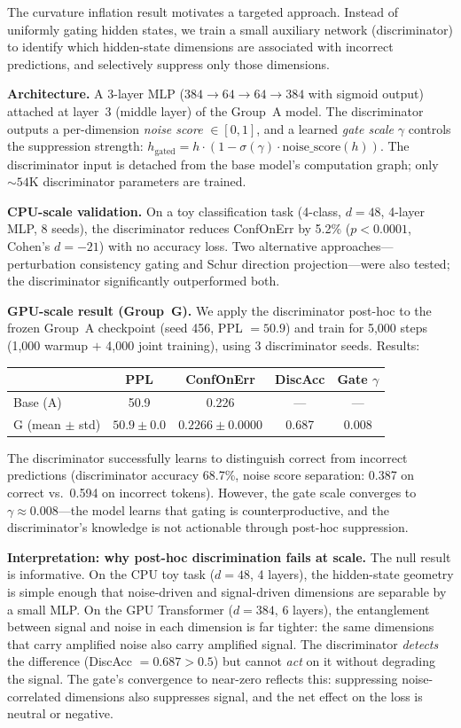 \documentclass[11pt,a4paper]{article}
\theoremstyle{definition}
\begin{document}
The curvature inflation result motivates a targeted approach.
Instead of uniformly gating hidden states, we train a small
auxiliary network (discriminator) to identify which hidden-state
dimensions are associated with incorrect predictions, and
selectively suppress only those dimensions.

\textbf{Architecture.} A 3-layer MLP ($384 \to 64 \to 64 \to 384$
with sigmoid output) attached at layer~3 (middle layer) of the
Group~A model. The discriminator outputs a per-dimension
\emph{noise score} $\in [0,1]$, and a learned \emph{gate scale}
$\gamma$ controls the suppression strength:
$h_{\mathrm{gated}} = h \cdot (1 - \sigma(\gamma) \cdot
\mathrm{noise\_score}(h))$.
The discriminator input is detached from the base model's
computation graph; only ${\sim}54$K discriminator parameters
are trained.

\textbf{CPU-scale validation.} On a toy classification task
(4-class, $d = 48$, 4-layer MLP, 8 seeds), the discriminator
reduces ConfOnErr by 5.2\% ($p < 0.0001$, Cohen's $d = -21$)
with no accuracy loss. Two alternative approaches---perturbation
consistency gating and Schur direction projection---were also
tested; the discriminator significantly outperformed both.

\textbf{GPU-scale result (Group~G).} We apply the discriminator
post-hoc to the frozen Group~A checkpoint (seed 456, PPL $= 50.9$)
and train for 5{,}000 steps (1{,}000 warmup $+$ 4{,}000 joint
training), using 3 discriminator seeds. Results:

\begin{center}
\begin{tabular}{lcccc}
 & PPL & ConfOnErr & DiscAcc & Gate $\gamma$ \\
\midrule
Base (A) & 50.9 & 0.226 & --- & --- \\
G (mean $\pm$ std) & $50.9 \pm 0.0$ & $0.2266 \pm 0.0000$
  & 0.687 & 0.008 \\
\end{tabular}
\end{center}

The discriminator successfully learns to distinguish correct from
incorrect predictions (discriminator accuracy 68.7\%, noise score
separation: 0.387 on correct vs.\ 0.594 on incorrect tokens).
However, the gate scale converges to $\gamma \approx 0.008$---the
model learns that gating is counterproductive, and the
discriminator's knowledge is not actionable through post-hoc
suppression.

\textbf{Interpretation: why post-hoc discrimination fails at scale.}
The null result is informative. On the CPU toy task ($d = 48$,
4 layers), the hidden-state geometry is simple enough that
noise-driven and signal-driven dimensions are separable by a
small MLP. On the GPU Transformer ($d = 384$, 6 layers), the
entanglement between signal and noise in each dimension is far
tighter: the same dimensions that carry amplified noise also carry
amplified signal. The discriminator \emph{detects} the difference
(DiscAcc $= 0.687 > 0.5$) but cannot \emph{act} on it without
degrading the signal. The gate's convergence to near-zero reflects
this: suppressing noise-correlated dimensions also suppresses
signal, and the net effect on the loss is neutral or negative.
\end{document}
